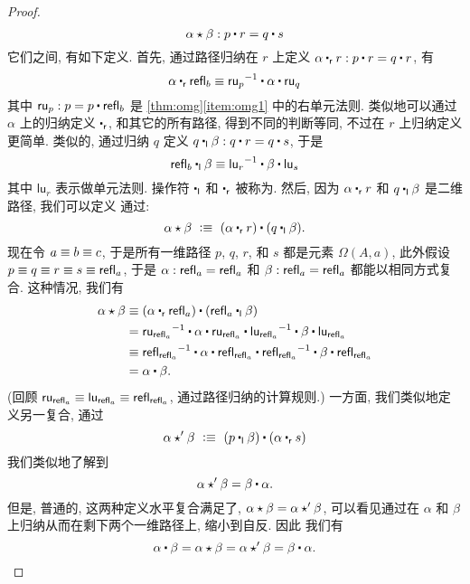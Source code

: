 \begin{proof}
    \begin{equation*}
        \alpha\hct\beta : p\ct r = q\ct s
    \end{equation*}
%
    它们之间, 有如下定义. 首先, 通过路径归纳在 $r$ 上定义 $\alpha \rightwhisker r : p\ct r = q\ct r$, 有
    \[
        \alpha \rightwhisker \refl{b} \jdeq \opp{\mathsf{ru}_p} \ct \alpha \ct \mathsf{ru}_q
    \]
    其中 $\mathsf{ru}_p : p = p \ct \refl{b}$ 是 \cref{thm:omg}\ref{item:omg1} 中的右单元法则.
    类似地可以通过 $\alpha$ 上的归纳定义 $\rightwhisker$, 和其它的所有路径, 得到不同的判断等同, 不过在 $r$ 上归纳定义更简单.
    类似的, 通过归纳 $q$ 定义 $q\leftwhisker \beta : q\ct r = q\ct s$, 于是
    \[ \refl{b} \leftwhisker \beta \jdeq \opp{\mathsf{lu}_r} \ct \beta \ct \mathsf{lu}_s \]
    其中 $\mathsf{lu}_r$ 表示做单元法则.
    操作符 $\leftwhisker$ 和 $\rightwhisker$ 被称为.
    然后, 因为 $\alpha \rightwhisker r$ 和 $q\leftwhisker \beta$ 是二维路径, 我们可以定义 %
    通过:
    \[
        \alpha\hct\beta\ \defeq\ (\alpha\rightwhisker r) \ct (q\leftwhisker \beta).
    \]
    现在令 $a \equiv b \equiv c$, 于是所有一维路径 $p$, $q$, $r$, 和 $s$ 都是元素 $\Omega(A,a)$, 此外假设 $p\equiv q \equiv r \equiv s\equiv \mathsf{refl}_{a}$, 于是 $\alpha:\mathsf{refl}_{a} = \mathsf{refl}_{a}$ 和 $\beta:\mathsf{refl}_{a} = \mathsf{refl}_{a}$ 都能以相同方式复合.
    这种情况, 我们有
    \begin{align*}
        \alpha\hct\beta
        &\jdeq (\alpha\rightwhisker\refl{a}) \ct (\refl{a}\leftwhisker \beta)\\
        &= \opp{\mathsf{ru}_{\refl{a}}} \ct \alpha \ct \mathsf{ru}_{\refl{a}} \ct \opp{\mathsf{lu}_{\refl a}} \ct \beta \ct \mathsf{lu}_{\refl{a}}\\
        &\jdeq \opp{\refl{\refl{a}}} \ct \alpha \ct \refl{\refl{a}} \ct \opp{\refl{\refl a}} \ct \beta \ct \refl{\refl{a}}\\
        &= \alpha \ct \beta.
    \end{align*}
    (回顾 $\mathsf{ru}_{\mathsf{refl}_{a}} \equiv \mathsf{lu}_{\mathsf{refl}_{a}} \equiv \mathsf{refl}_{\mathsf{refl}_{a}}$, 通过路径归纳的计算规则.)
    一方面, 我们类似地定义另一复合, 通过
    \[
        \alpha\hct'\beta\ \defeq\ (p\leftwhisker \beta)\ct (\alpha\rightwhisker s)
    \]
    我们类似地了解到
    \[
        \alpha\hct'\beta = \beta\ct\alpha.
    \]
    但是, 普通的, 这两种定义水平复合满足了, $\alpha\star\beta = \alpha\star'\beta$, 可以看见通过在 $\alpha$ 和 $\beta$ 上归纳从而在剩下两个一维路径上, 缩小到自反.
    因此 我们有
    \[\alpha \ct \beta = \alpha\hct\beta = \alpha\hct'\beta = \beta\ct\alpha.
    \qedhere
    \]
\end{proof}

